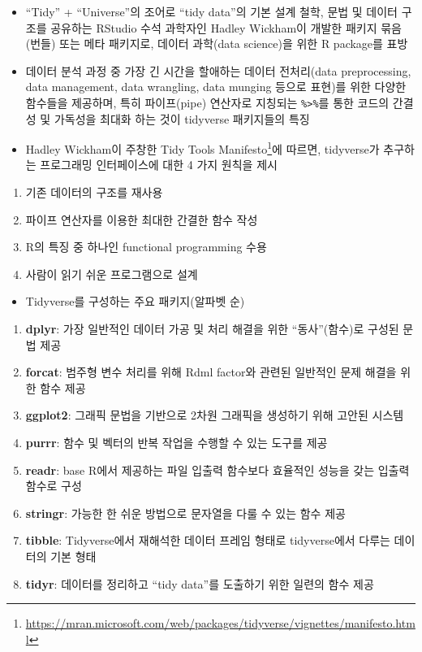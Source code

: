 \documentclass[
  11pt,
]{krantz}
\makeatletter
\providecommand{\tightlist}{%
  \setlength{\itemsep}{0pt}\setlength{\parskip}{0pt}}
\renewcommand{\href}[2]{#2\footnote{\url{#1}}}
\newenvironment{kframe}{%
\medskip{}
\setlength{\fboxsep}{.8em}
 \def\at@end@of@kframe{}%
 \ifinner\ifhmode%
  \def\at@end@of@kframe{\end{minipage}}%
  \begin{minipage}{\columnwidth}%
 \fi\fi%
 \def\FrameCommand##1{\hskip\@totalleftmargin \hskip-\fboxsep
 \colorbox{shadecolor}{##1}\hskip-\fboxsep
     \hskip-\linewidth \hskip-\@totalleftmargin \hskip\columnwidth}%
 \MakeFramed {\advance\hsize-\width
   \@totalleftmargin\z@ \linewidth\hsize
   \@setminipage}}%
 {\par\unskip\endMakeFramed%
 \at@end@of@kframe}
\renewenvironment{quote}{\begin{kframe}}{\end{kframe}}
\makeatother
\begin{document}
\begin{itemize}
\item
  ``Tidy'' + ``Universe''의 조어로 ``tidy data''의 기본 설계 철학, 문법 및 데이터 구조를 공유하는 RStudio 수석 과학자인 Hadley Wickham이 개발한 패키지 묶음(번들) 또는 메타 패키지로, 데이터 과학(data science)을 위한 R package를 표방 \citep{R-tidyverse}
\item
  데이터 분석 과정 중 가장 긴 시간을 할애하는 데이터 전처리(data preprocessing, data management, data wrangling, data munging 등으로 표현)를 위한 다양한 함수들을 제공하며, 특히 파이프(pipe) 연산자로 지칭되는 \texttt{\%\textgreater{}\%}를 통한 코드의 간결성 및 가독성을 최대화 하는 것이 tidyverse 패키지들의 특징
\item
  Hadley Wickham이 주창한 \href{https://mran.microsoft.com/web/packages/tidyverse/vignettes/manifesto.html}{Tidy Tools Manifesto}에 따르면, tidyverse가 추구하는 프로그래밍 인터페이스에 대한 4 가지 원칙을 제시
\end{itemize}

\begin{quote}
\begin{enumerate}
\def\labelenumi{\arabic{enumi})}
\item
  기존 데이터의 구조를 재사용
\item
  파이프 연산자를 이용한 최대한 간결한 함수 작성
\item
  R의 특징 중 하나인 functional programming 수용
\item
  사람이 읽기 쉬운 프로그램으로 설계
\end{enumerate}
\end{quote}

\begin{itemize}
\tightlist
\item
  Tidyverse를 구성하는 주요 패키지(알파벳 순)
\end{itemize}

\begin{quote}
\begin{enumerate}
\def\labelenumi{\arabic{enumi})}
\tightlist
\item
  \textbf{dplyr}: 가장 일반적인 데이터 가공 및 처리 해결을 위한 ``동사''(함수)로 구성된 문법 제공
\item
  \textbf{forcat}: 범주형 변수 처리를 위해 Rdml factor와 관련된 일반적인 문제 해결을 위한 함수 제공
\item
  \textbf{ggplot2}: 그래픽 문법을 기반으로 2차원 그래픽을 생성하기 위해 고안된 시스템
\item
  \textbf{purrr}: 함수 및 벡터의 반복 작업을 수행할 수 있는 도구를 제공
\item
  \textbf{readr}: base R에서 제공하는 파일 입출력 함수보다 효율적인 성능을 갖는 입출력 함수로 구성
\item
  \textbf{stringr}: 가능한 한 쉬운 방법으로 문자열을 다룰 수 있는 함수 제공
\item
  \textbf{tibble}: Tidyverse에서 재해석한 데이터 프레임 형태로 tidyverse에서 다루는 데이터의 기본 형태
\item
  \textbf{tidyr}: 데이터를 정리하고 ``tidy data''를 도출하기 위한 일련의 함수 제공
\end{enumerate}
\end{quote}
\end{document}
